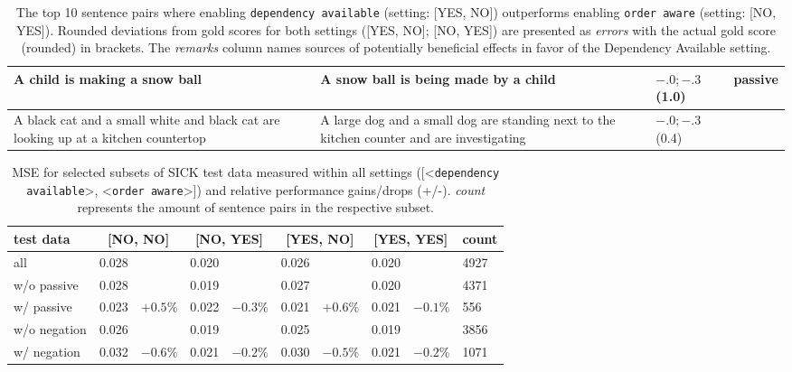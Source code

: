 \begin{table}[htb!]
\begin{tabularx}{\textwidth}{p{}|p{}|X|X}
		A child is making a snow ball & A snow ball is being made by a child & $-.0;-.3$ (1.0) & passive \\ \hline
		A black cat and a small white and black cat are looking up at a kitchen countertop & A large dog and a small dog are standing next to the kitchen counter and are investigating & $-.0;-.3$ (0.4) &  \\
		\hline \hline	
	\end{tabularx}
	\caption{The top 10 sentence pairs where enabling \texttt{dependency available} (setting: [YES, NO]) outperforms enabling \texttt{order aware} (setting: [NO, YES]). Rounded deviations from gold scores for both settings ([YES, NO]; [NO, YES]) are presented as \textit{errors} with the actual gold score (rounded) in brackets. The \textit{remarks} column names sources of potentially beneficial effects in favor of the Dependency Available setting.}
	\label{tab:results_benefit_DA}
\end{table}


\begin{table}[htb!]
	\centering
	\begin{tabularx}{\textwidth}{p{}|XX|XX|XX|XX|p{}} 
		 test data & \multicolumn{2}{c}{[NO, NO]} & \multicolumn{2}{|c|}{[NO, YES]} & \multicolumn{2}{c}{[YES, NO]} & \multicolumn{2}{|c|}{[YES, YES]} & count \\ \hline
		 all & 0.028 & & 0.020 & & 0.026 & & 0.020 & & 4927 \\ \hline
		 w/o passive & 0.028 & & 0.019 & & 0.027 & & 0.020 & & 4371 \\
		 w/ passive & 0.023 & $+0.5\%$ & 0.022 & $-0.3\%$ & 0.021 & $+0.6\%$ & 0.021 & $-0.1\%$ & 556 \\ \hline
		 w/o negation & 0.026 & & 0.019 & & 0.025 & & 0.019 & & 3856 \\
		 w/ negation & 0.032 & $-0.6\%$ & 0.021 & $-0.2\%$ & 0.030 & $-0.5\%$ & 0.021 & $-0.2\%$ & 1071 \\
	\end{tabularx}
	\caption{\ac{MSE} for selected subsets of SICK test data measured within all settings ([<\texttt{dependency available}>, <\texttt{order aware}>]) and relative performance gains/drops (+/-). \textit{count} represents the amount of sentence pairs in the respective subset.}
	\label{tab:mse_passive}
\end{table}

